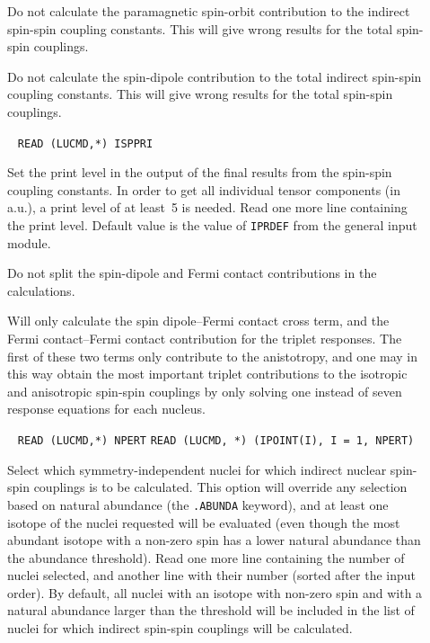 \begin{description}
\item[] Do not calculate the paramagnetic
spin-orbit contribution to the indirect
spin-spin coupling constants. This will 
give wrong results for the total spin-spin couplings.

\item[] Do not calculate the spin-dipole
contribution to 
the total indirect spin-spin coupling
constants. This will give wrong 
results for the total spin-spin couplings.

\item[]\verb| |\newline
\verb|READ (LUCMD,*) ISPPRI|

Set the print level in the output of the final results from the
spin-spin coupling constants. In order to get all individual tensor
components (in a.u.), a print level of at least~5 is needed. Read one
more line containing the print level. Default value is the value
of \verb|IPRDEF| from the general input module.

\item[] Do not split the
spin-dipole and Fermi
contact contributions in the calculations.

\item[]

Will only calculate the spin
dipole--Fermi contact cross
term, and the 
Fermi contact--Fermi contact contribution for the triplet
responses. The first of these two terms only contribute to the
anistotropy, and one may in this way obtain the most important triplet
contributions to the isotropic and 
anisotropic
spin-spin couplings by only solving one instead of seven response
equations for each nucleus.

\item[]\verb| |\newline
\verb|READ (LUCMD,*) NPERT|\newline
\verb|READ (LUCMD, *) (IPOINT(I), I = 1, NPERT)|

Select which symmetry-independent nuclei for which
indirect nuclear spin-spin couplings is to be calculated. This option
will override any 
selection based on natural abundance (the \verb|.ABUNDA| keyword), and
at least one isotope of the nuclei requested will be evaluated (even
though the most abundant isotope with a non-zero spin has a lower
natural abundance 
than the abundance threshold). Read one more line containing the
number of nuclei selected, and another line with their number (sorted after
the input order). By default, all nuclei with an isotope with non-zero spin
and with a natural abundance larger than the threshold will be included in
the list of nuclei for which indirect spin-spin couplings will be
calculated.
\end{description}

